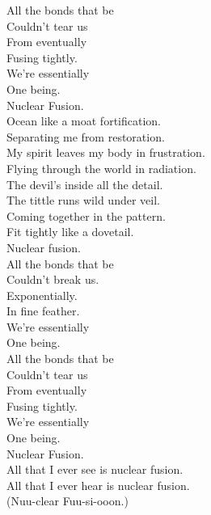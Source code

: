 All the bonds that be \\
Couldn't tear us \\
From eventually \\
Fusing tightly. \\
We're essentially \\
One being. \\
Nuclear Fusion. \\

Ocean like a moat fortification. \\
Separating me from restoration. \\
My spirit leaves my body in frustration. \\
Flying through the world in radiation. \\

The devil's inside all the detail. \\
The tittle runs wild under veil. \\
Coming together in the pattern. \\
Fit tightly like a dovetail. \\

Nuclear fusion. \\

All the bonds that be \\
Couldn't break us. \\
Exponentially. \\
In fine feather. \\
We're essentially \\
One being. \\

All the bonds that be \\
Couldn't tear us \\
From eventually \\
Fusing tightly. \\
We're essentially \\
One being. \\
Nuclear Fusion. \\

All that I ever see is nuclear fusion. \\
All that I ever hear is nuclear fusion. \\

(Nuu-clear Fuu-si-ooon.) \\





